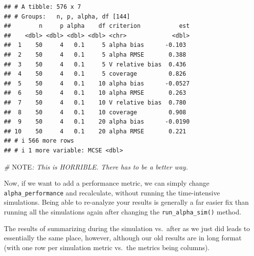 \documentclass[
]{book}
\newenvironment{Shaded}{\begin{snugshade}}{\end{snugshade}}
\newcommand{\AlertTok}[1]{\textcolor[rgb]{0.94,0.16,0.16}{#1}}
\newcommand{\AttributeTok}[1]{\textcolor[rgb]{0.13,0.29,0.53}{#1}}
\newcommand{\CommentTok}[1]{\textcolor[rgb]{0.56,0.35,0.01}{\textit{#1}}}
\newcommand{\FunctionTok}[1]{\textcolor[rgb]{0.13,0.29,0.53}{\textbf{#1}}}
\newcommand{\NormalTok}[1]{#1}
\newcommand{\OtherTok}[1]{\textcolor[rgb]{0.56,0.35,0.01}{#1}}
\newcommand{\SpecialCharTok}[1]{\textcolor[rgb]{0.81,0.36,0.00}{\textbf{#1}}}
\newcommand{\StringTok}[1]{\textcolor[rgb]{0.31,0.60,0.02}{#1}}
\begin{document}
\begin{Shaded}
\end{Shaded}

\begin{verbatim}
## # A tibble: 576 x 7
## # Groups:   n, p, alpha, df [144]
##        n     p alpha    df criterion           est
##    <dbl> <dbl> <dbl> <dbl> <chr>             <dbl>
##  1    50     4   0.1     5 alpha bias      -0.103 
##  2    50     4   0.1     5 alpha RMSE       0.388 
##  3    50     4   0.1     5 V relative bias  0.436 
##  4    50     4   0.1     5 coverage         0.826 
##  5    50     4   0.1    10 alpha bias      -0.0527
##  6    50     4   0.1    10 alpha RMSE       0.263 
##  7    50     4   0.1    10 V relative bias  0.780 
##  8    50     4   0.1    10 coverage         0.908 
##  9    50     4   0.1    20 alpha bias      -0.0190
## 10    50     4   0.1    20 alpha RMSE       0.221 
## # i 566 more rows
## # i 1 more variable: MCSE <dbl>
\end{verbatim}

\begin{Shaded}
\begin{Highlighting}[]
\CommentTok{\# }\AlertTok{NOTE}\CommentTok{: This is HORRIBLE.  There has to be a better way.}
\end{Highlighting}
\end{Shaded}

Now, if we want to add a performance metric, we can simply change \texttt{alpha\_performance} and recalculate, without running the time-intensive simulations.
Being able to re-analyze your results is generally a far easier fix than running all the simulations again
after changing the \texttt{run\_alpha\_sim()} method.

The results of summarizing during the simulation vs.~after as we just did
leads to essentially the same place, however, although our old results are in long format (with one row per simulation metric vs.~the metrics being columns).
\end{document}
